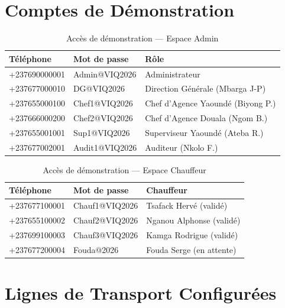 \documentclass[12pt,a4paper]{report}
\begin{document}
\appendix

\chapter{Comptes de Démonstration}

\begin{table}[h!]
\centering
\caption{Accès de démonstration — Espace Admin}
\begin{tabular}{lll}
\toprule
\textbf{Téléphone} & \textbf{Mot de passe} & \textbf{Rôle} \\
\midrule
+237690000001 & Admin@VIQ2026  & Administrateur \\
+237677000010 & DG@VIQ2026     & Direction Générale (Mbarga J-P) \\
+237655000100 & Chef1@VIQ2026  & Chef d'Agence Yaoundé (Biyong P.) \\
+237666000200 & Chef2@VIQ2026  & Chef d'Agence Douala (Ngom B.) \\
+237655001001 & Sup1@VIQ2026   & Superviseur Yaoundé (Ateba R.) \\
+237677002001 & Audit1@VIQ2026 & Auditeur (Nkolo F.) \\
\bottomrule
\end{tabular}
\end{table}

\begin{table}[h!]
\centering
\caption{Accès de démonstration — Espace Chauffeur}
\begin{tabular}{lll}
\toprule
\textbf{Téléphone} & \textbf{Mot de passe} & \textbf{Chauffeur} \\
\midrule
+237677100001 & Chauf1@VIQ2026 & Tsafack Hervé (validé) \\
+237655100002 & Chauf2@VIQ2026 & Nganou Alphonse (validé) \\
+237699100003 & Chauf3@VIQ2026 & Kamga Rodrigue (validé) \\
+237677200004 & Fouda@2026     & Fouda Serge (en attente) \\
\bottomrule
\end{tabular}
\end{table}

\chapter{Lignes de Transport Configurées}
\end{document}
